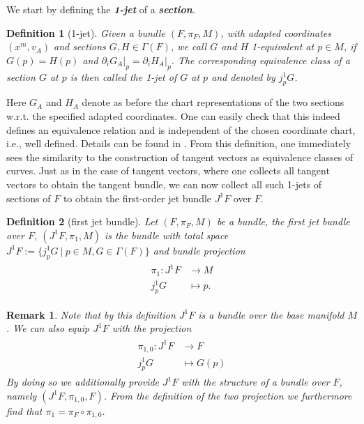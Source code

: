 \documentclass[a4paper,12pt, DIV=14, BCOR=5mm, twoside, headsepline, numbers=noenddot]{scrbook}
\newtheorem{definition}{Definition}[section]
\newtheorem*{remark}{Remark}
\begin{document}
We start by defining the \textbf{\textit{1-jet}} of a \textbf{\textit{section}}.
\begin{definition}[1-jet] 
Given a bundle $(F, \pi_F, M)$, with adapted coordinates $(x^m, v_A)$ and sections $G,H \in \Gamma(F)$, we call $G$ and $H$ 1-equivalent at $p \in M$, if $G(p) = H(p)$ and $\partial_i G_A \vert_p = \partial_i H_A \vert_p$. The corresponding equivalence class of a section $G$ at $p$ is then called the 1-jet of $G$ at $p$ and denoted by $j^1_pG$.
\end{definition}
Here $G_A$ and $H_A$ denote as before the chart representations of the two sections w.r.t. the specified adapted coordinates. One can easily check that this indeed defines an equivalence relation and is independent of the chosen coordinate chart, i.e., well defined. Details can be found in \cite{saunders_1989}. From this definition, one immediately sees the similarity to the construction of tangent vectors as equivalence classes of curves. Just as in the case of tangent vectors, where one collects all tangent vectors to obtain the tangent bundle, we can now collect all such 1-jets of sections of $F$ to obtain the first-order jet bundle $J^1F$ over $F$. 
\begin{definition}[first jet bundle]
Let $(F, \pi_F, M)$ be a bundle, the first jet bundle over $F$, $(J^1F,\pi_1,M)$ is the bundle with total space $J^1F := \{j^1_pG \ \vert \  p \in M, G \in \Gamma(F)\}$ and bundle projection 
\begin{align}
    \begin{aligned}
\pi_1 : J^1F &\longrightarrow M \\
j^1_pG &\longmapsto p.
    \end{aligned}
\end{align}
\end{definition}
\begin{remark}
Note that by this definition $J^1F$ is a bundle over the base manifold $M$. We can also equip $J^1F$ with the projection 
\begin{align}
    \begin{aligned}
    \pi_{1,0} : J^1F &\longrightarrow F \\
    j^1_pG &\longmapsto G(p)
    \end{aligned}
\end{align}
By doing so we additionally provide $J^1F$ with the structure of a bundle over $F$, namely $(J^1F,\pi_{1,0},F)$. From the definition of the two projection we furthermore find that $\pi_1 = \pi_F \circ \pi_{1,0}$. 
\end{remark}
\end{document}
